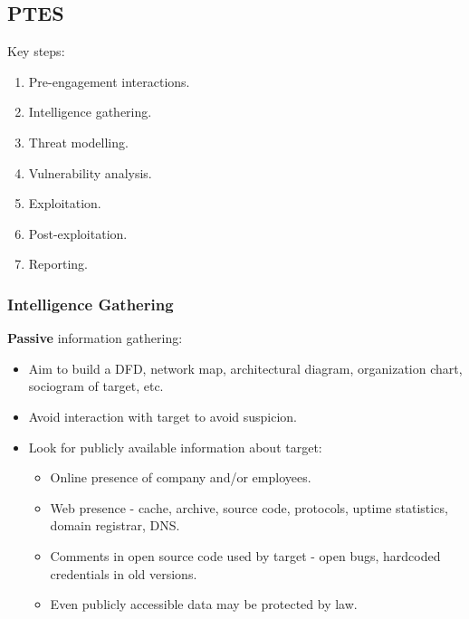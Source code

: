\documentclass[11pt]{article}
\begin{document}
\subsection{PTES}
Key steps:
\begin{enumerate}
  \item Pre-engagement interactions.
  \item Intelligence gathering.
  \item Threat modelling.
  \item Vulnerability analysis.
  \item Exploitation.
  \item Post-exploitation.
  \item Reporting.
\end{enumerate}

\subsubsection{Intelligence Gathering}
\textbf{Passive} information gathering:
\begin{itemize}
  \item Aim to build a DFD, network map, architectural diagram, organization chart, sociogram of target, etc.
  \item Avoid interaction with target to avoid suspicion.
  \item Look for publicly available information about target:
    \begin{itemize}
      \item Online presence of company and/or employees.
      \item Web presence - cache, archive, source code, protocols, uptime statistics, domain registrar, DNS.
      \item Comments in open source code used by target - open bugs, hardcoded credentials in old versions.
      \item Even publicly accessible data may be protected by law.
    \end{itemize}
\end{itemize}
\end{document}
